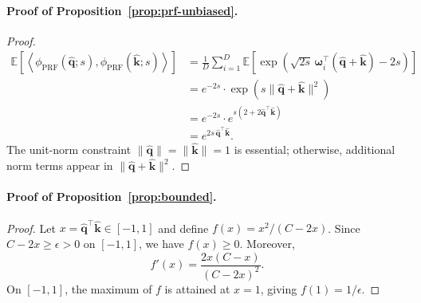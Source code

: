 \documentclass{article}
\begin{document}
\paragraph{Proof of Proposition~\ref{prop:prf-unbiased}.}
\begin{proof}
\begin{align*}
\mathbb{E}\!\left[
\left\langle
\phi_{\text{PRF}}(\widehat{\mathbf{q}}; s),
\phi_{\text{PRF}}(\widehat{\mathbf{k}}; s)
\right\rangle
\right]
&=
\frac{1}{D}
\sum_{i=1}^D
\mathbb{E}\!\left[
\exp\!\left(
\sqrt{2s}\,
\boldsymbol{\omega}_i^\top
(\widehat{\mathbf{q}} + \widehat{\mathbf{k}})
- 2s
\right)
\right] \\
&=
e^{-2s}
\cdot
\exp\!\left(
s \|\widehat{\mathbf{q}} + \widehat{\mathbf{k}}\|^2
\right) \\
&=
e^{-2s}
\cdot
e^{s(2 + 2\widehat{\mathbf{q}}^\top \widehat{\mathbf{k}})} \\
&=
e^{2s\,\widehat{\mathbf{q}}^\top \widehat{\mathbf{k}}}.
\end{align*}
The unit-norm constraint
$\|\widehat{\mathbf{q}}\| = \|\widehat{\mathbf{k}}\| = 1$
is essential; otherwise, additional norm terms appear in
$\|\widehat{\mathbf{q}}+\widehat{\mathbf{k}}\|^2$.
\end{proof}

\paragraph{Proof of Proposition~\ref{prop:bounded}.}
\begin{proof}
Let $x = \widehat{\mathbf{q}}^\top \widehat{\mathbf{k}} \in [-1,1]$
and define $f(x)=x^2/(C-2x)$.
Since $C-2x \ge \epsilon > 0$ on $[-1,1]$, we have $f(x)\ge 0$.
Moreover,
\[
f'(x)=\frac{2x(C-x)}{(C-2x)^2}.
\]
On $[-1,1]$, the maximum of $f$ is attained at $x=1$, giving
$f(1)=1/\epsilon$.
\end{proof}
\end{document}
